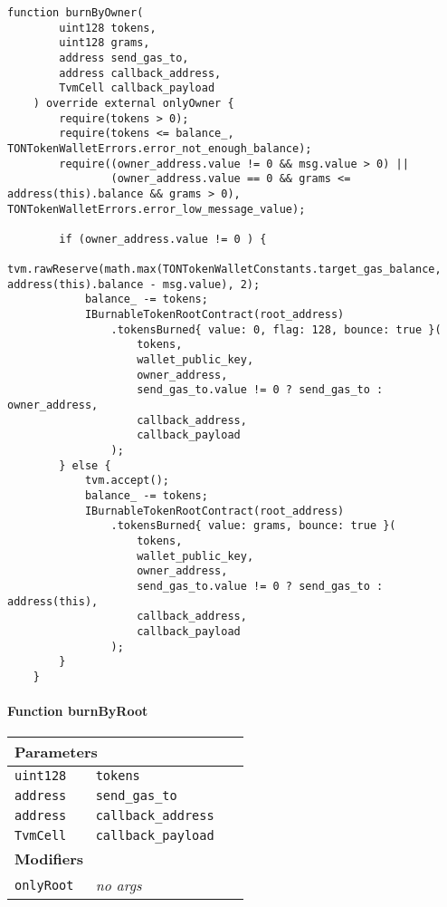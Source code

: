 \vspace{2cm}

\begin{lstlisting}[firstnumber=473]
    function burnByOwner(
        uint128 tokens,
        uint128 grams,
        address send_gas_to,
        address callback_address,
        TvmCell callback_payload
    ) override external onlyOwner {
        require(tokens > 0);
        require(tokens <= balance_, TONTokenWalletErrors.error_not_enough_balance);
        require((owner_address.value != 0 && msg.value > 0) ||
                (owner_address.value == 0 && grams <= address(this).balance && grams > 0), TONTokenWalletErrors.error_low_message_value);

        if (owner_address.value != 0 ) {
            tvm.rawReserve(math.max(TONTokenWalletConstants.target_gas_balance, address(this).balance - msg.value), 2);
            balance_ -= tokens;
            IBurnableTokenRootContract(root_address)
                .tokensBurned{ value: 0, flag: 128, bounce: true }(
                    tokens,
                    wallet_public_key,
                    owner_address,
                    send_gas_to.value != 0 ? send_gas_to : owner_address,
                    callback_address,
                    callback_payload
                );
        } else {
            tvm.accept();
            balance_ -= tokens;
            IBurnableTokenRootContract(root_address)
                .tokensBurned{ value: grams, bounce: true }(
                    tokens,
                    wallet_public_key,
                    owner_address,
                    send_gas_to.value != 0 ? send_gas_to : address(this),
                    callback_address,
                    callback_payload
                );
        }
    }
\end{lstlisting}

\paragraph{Function burnByRoot}


\ifsoltables
\noindent\begin{tabular}{|l|l|p{5cm}|}\hline
\multicolumn{3}{|l|}{\bf Parameters}\\\hline
\tt uint128 & \tt tokens &\\\hline
\tt address & \tt send\_{}gas\_{}to &\\\hline
\tt address & \tt callback\_{}address &\\\hline
\tt TvmCell & \tt callback\_{}payload &\\\hline
\multicolumn{3}{|l|}{\bf Modifiers}\\\hline
\tt onlyRoot & {\em no args} &\\\hline
\end{tabular}
\fi

